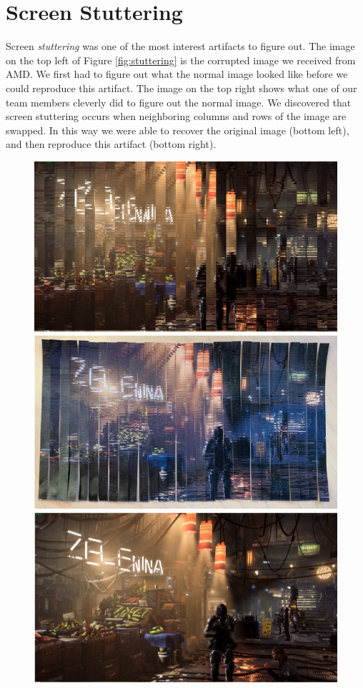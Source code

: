 \section*{Screen Stuttering}
Screen \textit{stuttering} was one of the most interest artifacts to figure out. The image on the top left of Figure \ref{fig:stuttering} is the corrupted image we received from AMD. We first had to figure out what the normal image looked like before we could reproduce this artifact. The image on the top right shows what one of our team members cleverly did to figure out the normal image. We discovered that screen stuttering occurs when neighboring columns and rows of the image are swapped. In this way we were able to recover the original image (bottom left), and then reproduce this artifact (bottom right).

\begin{figure}[!ht]
\centering
\includegraphics[scale=0.29]{images/stutter1.png}
\includegraphics[scale=0.458]{images/stutter2.png}
\includegraphics[scale=0.68]{images/stutter.png}

\end{figure}
